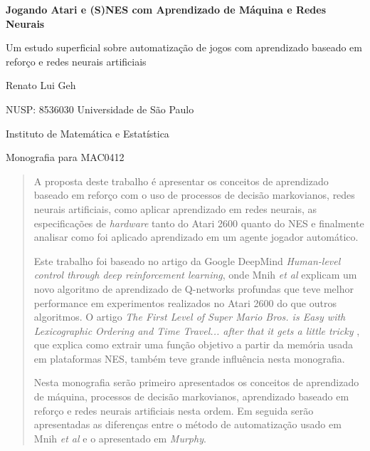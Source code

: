 \documentclass[a4paper,10pt]{article}
\theoremstyle{plain}
\begin{document}
\begin{titlepage}
  \begin{center}
    \LARGE
    \textbf{Jogando Atari e (S)NES com Aprendizado de Máquina e Redes Neurais}

    \vspace{1.7cm}
    \Large
    Um estudo superficial sobre automatização de jogos com aprendizado baseado em reforço e
    redes neurais artificiais

    \vspace{1.7cm}
    \Large
    Renato Lui Geh

    NUSP: 8536030
    \vfill
    \Large
    Universidade de São Paulo

    Instituto de Matemática e Estatística

    Monografia para MAC0412
    \vspace{1.5cm}
  \end{center}
\end{titlepage}

\newpage
\null\vspace{\fill}
\begin{abstract}
  \large
  A proposta deste trabalho é apresentar os conceitos de aprendizado baseado em reforço com o uso
  de processos de decisão markovianos, redes neurais artificiais, como aplicar aprendizado em redes
  neurais, as especificações de \textit{hardware} tanto do Atari 2600 quanto do NES e finalmente
  analisar como foi aplicado aprendizado em um agente jogador automático.

  Este trabalho foi baseado no artigo da Google DeepMind \textit{Human-level control through deep
  reinforcement learning}\cite{mnih-et-al}, onde Mnih \textit{et al} explicam um novo algoritmo de
  aprendizado de Q-networks profundas que teve melhor performance em experimentos realizados no
  Atari 2600 do que outros algoritmos. O artigo \textit{The First Level of Super Mario Bros. is
  Easy with Lexicographic Ordering and Time Travel... \small{after that it gets a little tricky}}
  \cite{dr-murphy}, que explica como extrair uma função objetivo a partir da memória usada em
  plataformas NES, também teve grande influência nesta monografia.

  Nesta monografia serão primeiro apresentados os conceitos de aprendizado de máquina, processos
  de decisão markovianos, aprendizado baseado em reforço e redes neurais artificiais nesta ordem.
  Em seguida serão apresentadas as diferenças entre o método de automatização usado em Mnih
  \textit{et al} e o apresentado em \textit{Murphy}.
\end{abstract}
\vspace{\fill}
\newpage
\large
\tableofcontents
\normalsize
\newpage
\end{document}
